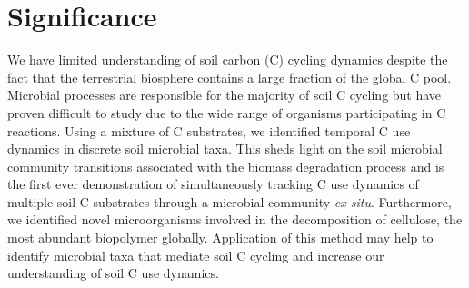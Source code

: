 \section{Significance} 
We have limited understanding of soil carbon (C) cycling dynamics despite the fact that the terrestrial biosphere contains a large fraction of the global C pool. Microbial processes are responsible for the majority of soil C cycling but have proven difficult to study due to the wide range of organisms participating in C reactions. Using a mixture of C substrates, we identified temporal C use dynamics in discrete soil microbial taxa. This sheds light on the soil microbial community transitions associated with the biomass degradation process and is the first ever demonstration of simultaneously tracking C use dynamics of multiple soil C substrates through a microbial community \textit{ex situ}. Furthermore, we identified novel microorganisms involved in the decomposition of cellulose, the most abundant biopolymer globally. Application of this method may help to identify microbial taxa that mediate soil C cycling and increase our understanding of soil C use dynamics. 